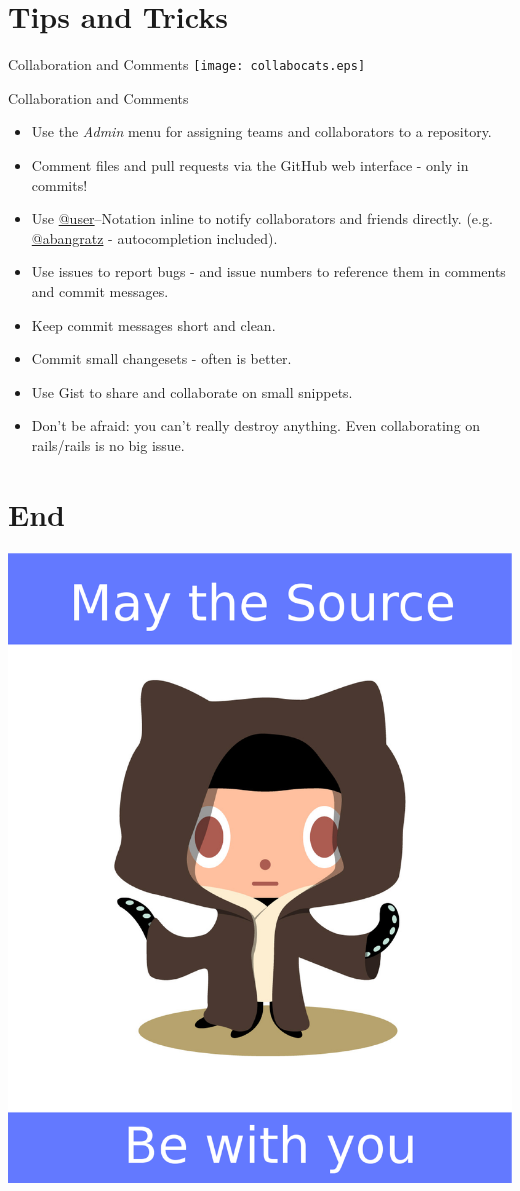 \documentclass[style=husky,display=slides,clock]{powerdot}
\begin{document}
\section{Tips and Tricks}
\begin{slide}{Collaboration and Comments}
	\texttt{[image: collabocats.eps]}
\end{slide}
\begin{note}{Collaboration and Comments}
	\begin{itemize}
		\item Use the \textit{Admin} menu for assigning teams and collaborators to a repository.
		\item Comment files and pull requests via the GitHub web interface - only in commits!
		\item Use \url{@user}--Notation inline to notify collaborators and friends directly. (e.g. \url{@abangratz} -
			autocompletion included).
		\item Use issues to report bugs - and issue numbers to reference them in comments and commit messages.
		\item Keep commit messages short and clean.
		\item Commit small changesets - often is better.
		\item Use Gist to share and collaborate on small snippets.
		\item Don't be afraid: you can't really destroy anything. Even collaborating on rails/rails is no big issue.
	\end{itemize}
\end{note}
\section[tocsection=hidden,slide=false]{End}
\begin{emptyslide}{}
	\centering
	\includegraphics[scale=0.2]{octobiwan_source.eps}
\end{emptyslide}
\end{document}
